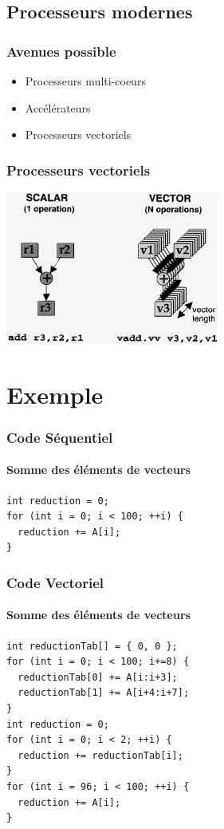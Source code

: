 \documentclass{beamer}
\begin{document}
\subsection{Processeurs modernes}
\begin{frame}
\frametitle{Avenues possible}
\begin{itemize}
\item Processeurs multi-coeurs
\item Accélérateurs
\item Processeurs vectoriels
\end{itemize}
\end{frame}

\begin{frame}
\frametitle{Processeurs vectoriels}
\begin{center}
\includegraphics[scale=0.85]{Vector.jpg}
\end{center}
\end{frame}

\section{Exemple}
\begin{frame}[fragile]
\frametitle{Code Séquentiel}
\framesubtitle{Somme des éléments de vecteurs}
\begin{lstlisting}
int reduction = 0;
for (int i = 0; i < 100; ++i) {
  reduction += A[i];
}
\end{lstlisting}
\end{frame}

\begin{frame}[fragile]
\frametitle{Code Vectoriel}
\framesubtitle{Somme des éléments de vecteurs}
\begin{lstlisting}
int reductionTab[] = { 0, 0 };
for (int i = 0; i < 100; i+=8) {
  reductionTab[0] += A[i:i+3]; 
  reductionTab[1] += A[i+4:i+7];
}
int reduction = 0;
for (int i = 0; i < 2; ++i) {
  reduction += reductionTab[i];
}
for (int i = 96; i < 100; ++i) {
  reduction += A[i];
}
\end{lstlisting}
\end{frame}
\end{document}
